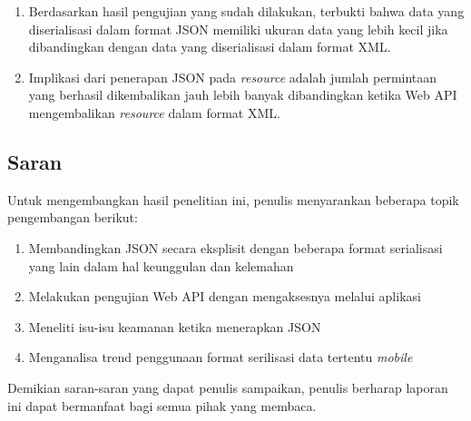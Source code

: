 \documentclass{llncs}
\begin{document}
\begin{enumerate}
  \item Berdasarkan hasil pengujian yang sudah dilakukan, terbukti bahwa data yang diserialisasi dalam format JSON memiliki ukuran data yang lebih kecil jika dibandingkan dengan data yang diserialisasi dalam format XML.
  \item Implikasi dari penerapan JSON pada \textit{resource} adalah jumlah permintaan yang berhasil dikembalikan jauh lebih banyak dibandingkan ketika Web API mengembalikan \textit{resource} dalam format XML.
\end{enumerate}

\subsection{Saran}

Untuk mengembangkan hasil penelitian ini, penulis menyarankan beberapa topik pengembangan berikut:

\begin{enumerate}
  \item Membandingkan JSON secara eksplisit dengan beberapa format serialisasi yang lain dalam hal keunggulan dan kelemahan
  \item Melakukan pengujian Web API dengan mengaksesnya melalui aplikasi
  \item Meneliti isu-isu keamanan ketika menerapkan JSON
  \item Menganalisa trend penggunaan format serilisasi data tertentu  
  \textit{mobile}
\end{enumerate}

Demikian saran-saran yang dapat penulis sampaikan, penulis berharap laporan ini dapat bermanfaat bagi semua pihak yang membaca.



%
%
\end{document}
